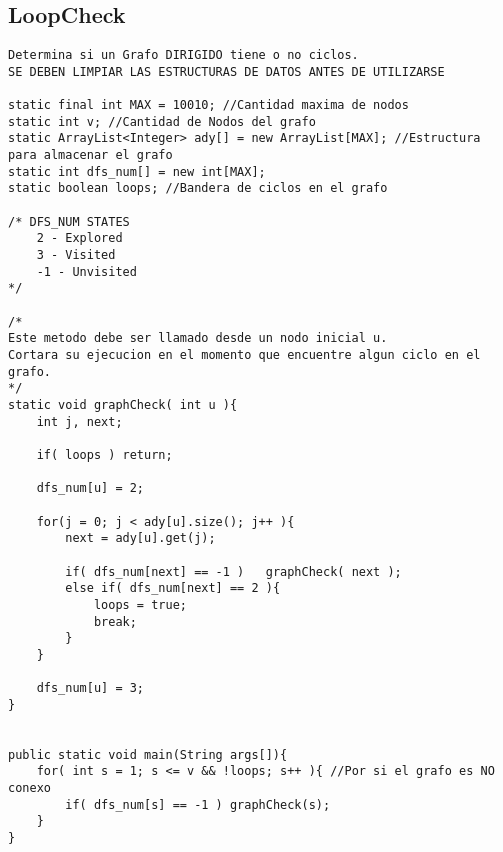 \documentclass[10pt,letterpaper,twocolumn,twosided]{article}
\begin{document}
\subsection{LoopCheck}
\begin{lstlisting}
Determina si un Grafo DIRIGIDO tiene o no ciclos.
SE DEBEN LIMPIAR LAS ESTRUCTURAS DE DATOS ANTES DE UTILIZARSE

static final int MAX = 10010; //Cantidad maxima de nodos
static int v; //Cantidad de Nodos del grafo
static ArrayList<Integer> ady[] = new ArrayList[MAX]; //Estructura para almacenar el grafo
static int dfs_num[] = new int[MAX]; 
static boolean loops; //Bandera de ciclos en el grafo

/* DFS_NUM STATES
	2 - Explored
	3 - Visited
 	-1 - Unvisited
*/

/*
Este metodo debe ser llamado desde un nodo inicial u.
Cortara su ejecucion en el momento que encuentre algun ciclo en el grafo.
*/
static void graphCheck( int u ){
	int j, next;
	
	if( loops ) return;
	
	dfs_num[u] = 2;
	
	for(j = 0; j < ady[u].size(); j++ ){
		next = ady[u].get(j);
		
		if( dfs_num[next] == -1 )	graphCheck( next );
		else if( dfs_num[next] == 2 ){
			loops = true;
			break;
		}
	}
	
	dfs_num[u] = 3;
}


public static void main(String args[]){
	for( int s = 1; s <= v && !loops; s++ ){ //Por si el grafo es NO conexo
		if( dfs_num[s] == -1 ) graphCheck(s);
	}
}\end{lstlisting}
\end{document}
